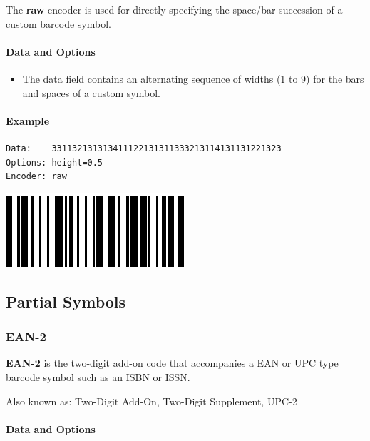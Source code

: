 The \textbf{raw} encoder is used for directly specifying the space/bar
succession of a custom barcode symbol.

\hypertarget{data-and-options-82}{%
\paragraph{Data and Options}\label{data-and-options-82}}

\begin{itemize}
\tightlist
\item
  The data field contains an alternating sequence of widths (1 to 9) for
  the bars and spaces of a custom symbol.
\end{itemize}

\hypertarget{example-22}{%
\paragraph{Example}\label{example-22}}

\begin{verbatim}
Data:    331132131313411122131311333213114131131221323
Options: height=0.5
Encoder: raw
\end{verbatim}

\includegraphics{images/raw-1.eps}

\hypertarget{partial-symbols}{%
\subsection{Partial Symbols}\label{partial-symbols}}

\hypertarget{ean-2}{%
\subsubsection{EAN-2}\label{ean-2}}

\textbf{EAN-2} is the two-digit add-on code that accompanies a EAN or
UPC type barcode symbol such as an \protect\hyperlink{isbn}{ISBN} or
\protect\hyperlink{issn}{ISSN}.

Also known as: Two-Digit Add-On, Two-Digit Supplement, UPC-2

\hypertarget{data-and-options-83}{%
\paragraph{Data and Options}\label{data-and-options-83}}

